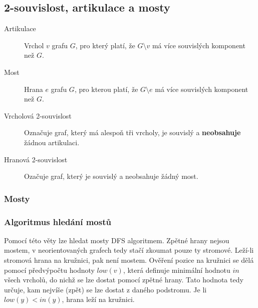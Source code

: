 \subsection{2-souvislost, artikulace a mosty}

\begin{description}
    \item[Artikulace] Vrchol $v$ grafu $G$, pro který platí, že $G \setminus v$ má více souvislých komponent než $G$.
    \item[Most] Hrana $e$ grafu $G$, pro kterou platí, že $G \setminus e$ má více souvislých komponent než $G$.
    \item[Vrcholová 2-souvislost] Označuje graf, který má alespoň tři vrcholy, je souvislý a \textbf{neobsahuje} žádnou artikulaci.
    \item[Hranová 2-souvislost] Ozačuje graf, který je souvislý a neobsahuje žádný most.
\end{description}

\subsubsection{Mosty}


\subsubsection{Algoritmus hledání mostů}

Pomocí této věty lze hledat mosty DFS algoritmem.
Zpětné hrany nejsou mostem, v neorientovaných grafech tedy stačí zkoumat pouze ty stromové.
Leží-li stromová hrana na kružnici, pak není mostem.
Ověření pozice na kružnici se dělá pomocí předvýpočtu hodnoty $low(v)$, která definuje minimální hodnotu $in$ všech vrcholů, do nichž se lze dostat pomocí zpětné hrany.
Tato hodnota tedy určuje, kam nejvíše (zpět) se lze dostat z daného podstromu.
Je li $low(y) < in(y)$, hrana leží na kružnici.